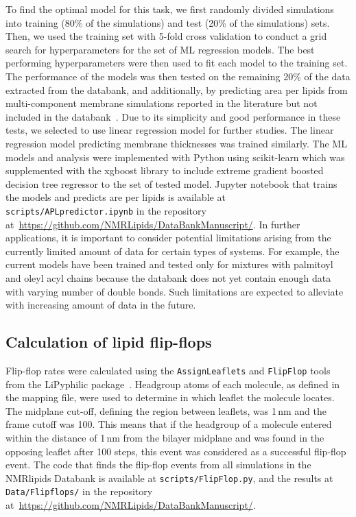 \documentclass[fleqn,10pt]{wlscirep}
\begin{document}
To find the optimal model for this task, we first randomly divided simulations into training (80\% of the simulations) and test (20\% of the simulations) sets. Then, we used the training set with 5-fold cross validation to conduct a grid search for hyperparameters for the set of ML regression models. The best performing hyperparameters were then used to fit each model to the training set. The performance of the models was then tested on the remaining 20\% of the data extracted from the databank, and additionally, by predicting area per lipids from multi-component membrane simulations reported in the literature but not included in the databank~\cite{shahane19,kumar21,oliveira22}. Due to its  simplicity and good performance in these tests, we selected to use linear regression model for further studies. The linear regression model predicting membrane thicknesses was trained similarly. The ML models and analysis were implemented with Python using scikit-learn which was supplemented with the xgboost library to include extreme gradient boosted decision tree regressor to the set of tested model. Jupyter notebook that trains the models and predicts are per lipids is available at \texttt{scripts/APLpredictor.ipynb} in the repository at~\url{https://github.com/NMRLipids/DataBankManuscript/}. In further applications, it is important to consider potential limitations arising from the currently limited amount of data for certain types of systems. For example, the current models have been trained and tested only for mixtures with palmitoyl and oleyl acyl chains because the databank does not yet contain enough data with varying number of double bonds. Such limitations are expected to alleviate with increasing amount of data in the future.

\subsection{Calculation of lipid flip-flops}
Flip-flop rates were calculated using the \texttt{AssignLeaflets} and \texttt{FlipFlop} tools from the LiPyphilic package~\cite{LiPyphilic2021}.
Headgroup atoms of each molecule, as defined in the mapping file, were used to determine in which leaflet the molecule locates. The midplane cut-off, defining the region between leaflets, was 1\,nm and the frame cutoff was 100. This means that if the headgroup of a molecule entered within the distance of 1\,nm from the bilayer midplane and was found in the opposing leaflet after 100 steps, this event was considered as a successful flip-flop event. The code that finds the flip-flop events from all simulations in the NMRlipids Databank is available at \texttt{scripts/FlipFlop.py}, and the results at \texttt{Data/Flipflops/} in the repository at~\url{https://github.com/NMRLipids/DataBankManuscript/}. 
\end{document}
